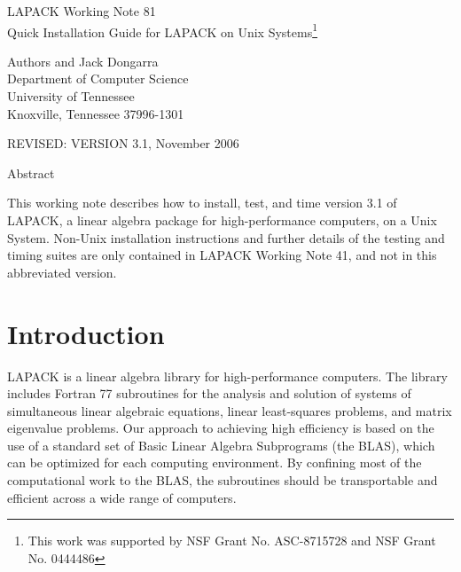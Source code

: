\documentclass[11pt]{report}
\begin{document}
\begin{center}
  {\Large LAPACK Working Note 81\\
  Quick Installation Guide for LAPACK on Unix Systems\footnote{This work was
 supported by NSF Grant No. ASC-8715728  and NSF Grant No. 0444486}}
\end{center}
\begin{center}
  Authors and Jack Dongarra\\
  Department of Computer Science \\
  University of Tennessee \\
  Knoxville, Tennessee  37996-1301 \\
\end{center}
\begin{center}
  REVISED:  VERSION 3.1, November 2006
\end{center}

\begin{center}
Abstract
\end{center}
This working note describes how to install, test, and time version 3.1
of LAPACK, a linear algebra package for high-performance
computers, on a Unix System.  Non-Unix installation instructions and
further details of the testing and timing suites are only contained in
LAPACK Working Note 41, and not in this abbreviated version.
\newpage

\tableofcontents

\newpage

\section{Introduction}

LAPACK is a linear algebra library for high-performance
computers.
The library includes Fortran 77 subroutines for 
the analysis and solution of systems of simultaneous linear algebraic
equations, linear least-squares problems, and matrix eigenvalue
problems.
Our approach to achieving high efficiency is based on the use of
a standard set of Basic Linear Algebra Subprograms (the BLAS),
which can be optimized for each computing environment.
By confining most of the computational work to the BLAS,
the subroutines should be 
transportable and efficient across a wide range of computers.
\end{document}
